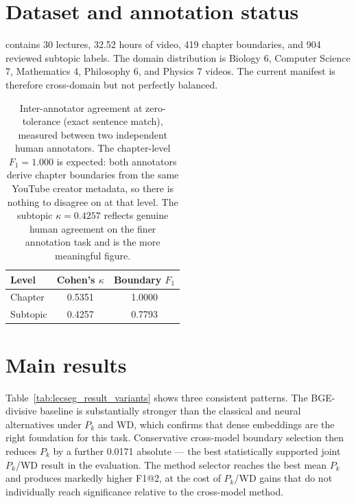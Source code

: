 

\section{Dataset and annotation status}
\label{sec:dataset_status}

\dataset{} contains 30 lectures, 32.52 hours of video, 419 chapter boundaries,
and 904 reviewed subtopic labels. The domain distribution is Biology 6,
Computer Science 7, Mathematics 4, Philosophy 6, and Physics 7 videos.
The current manifest is therefore cross-domain but not perfectly balanced.

\begin{table}[t]
  \centering
  \caption{Inter-annotator agreement at zero-tolerance (exact sentence match),
    measured between two independent human annotators.
    The chapter-level $F_1=1.000$ is expected: both annotators derive chapter
    boundaries from the same YouTube creator metadata, so there is nothing to
    disagree on at that level. The subtopic $\kappa=0.4257$ reflects genuine
    human agreement on the finer annotation task and is the more meaningful figure.}
  \label{tab:iaa}
  \begin{tabular}{lcc}
    \toprule
    Level & Cohen's $\kappa$ & Boundary $F_1$ \\
    \midrule
    Chapter & 0.5351 & 1.0000 \\
    Subtopic & 0.4257 & 0.7793 \\
    \bottomrule
  \end{tabular}
\end{table}

\section{Main results}
\label{sec:main}



Table~\ref{tab:lecseg_result_variants} shows three consistent patterns.
The BGE-divisive baseline is substantially stronger than the classical and
neural alternatives under $P_k$ and WD, which confirms that dense embeddings
are the right foundation for this task. Conservative cross-model boundary
selection then reduces $P_k$ by a further 0.0171 absolute --- the best
statistically supported joint $P_k$/WD result in the evaluation.
The method selector reaches the best mean $P_k$ and produces markedly higher
F1@2, at the cost of $P_k$/WD gains that do not individually reach significance
relative to the cross-model method.

